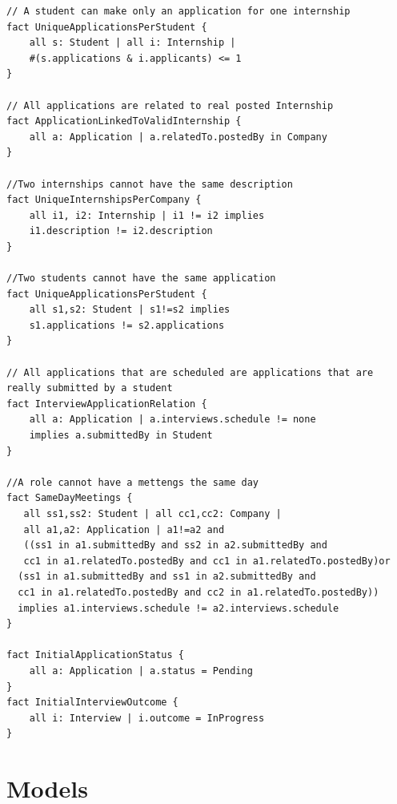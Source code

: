 \begin{lstlisting}
// A student can make only an application for one internship
fact UniqueApplicationsPerStudent {
    all s: Student | all i: Internship | 
    #(s.applications & i.applicants) <= 1
}

// All applications are related to real posted Internship
fact ApplicationLinkedToValidInternship {
    all a: Application | a.relatedTo.postedBy in Company
}

//Two internships cannot have the same description 
fact UniqueInternshipsPerCompany {
    all i1, i2: Internship | i1 != i2 implies 
    i1.description != i2.description
}

//Two students cannot have the same application
fact UniqueApplicationsPerStudent {
    all s1,s2: Student | s1!=s2 implies 
    s1.applications != s2.applications
}

// All applications that are scheduled are applications that are really submitted by a student
fact InterviewApplicationRelation {
    all a: Application | a.interviews.schedule != none 
    implies a.submittedBy in Student
}

//A role cannot have a mettengs the same day
fact SameDayMeetings {
   all ss1,ss2: Student | all cc1,cc2: Company |
   all a1,a2: Application | a1!=a2 and
   ((ss1 in a1.submittedBy and ss2 in a2.submittedBy and
   cc1 in a1.relatedTo.postedBy and cc1 in a1.relatedTo.postedBy)or
  (ss1 in a1.submittedBy and ss1 in a2.submittedBy and
  cc1 in a1.relatedTo.postedBy and cc2 in a1.relatedTo.postedBy))
  implies a1.interviews.schedule != a2.interviews.schedule
}

fact InitialApplicationStatus {
    all a: Application | a.status = Pending
}
fact InitialInterviewOutcome {
    all i: Interview | i.outcome = InProgress
}

\end{lstlisting}



\section{ Models}
